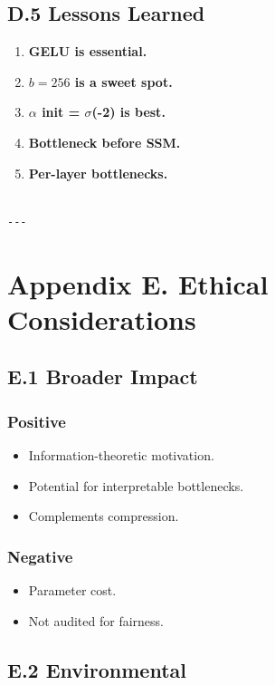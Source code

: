 \subsection{D.5 Lessons Learned}

\begin{enumerate}
\item \textbf{GELU is essential.}
\item \textbf{$b = 256$ is a sweet spot.}
\item \textbf{$\alpha$ init = $\sigma$(-2) is best.}
\item \textbf{Bottleneck before SSM.}
\item \textbf{Per-layer bottlenecks.}
\end{enumerate}
\begin{lstlisting}

---
\end{lstlisting}

\section{Appendix E. Ethical Considerations}

\subsection{E.1 Broader Impact}

\subsubsection{Positive}
\begin{itemize}
\item Information-theoretic motivation.
\item Potential for interpretable bottlenecks.
\item Complements compression.

\end{itemize}
\subsubsection{Negative}
\begin{itemize}
\item Parameter cost.
\item Not audited for fairness.

\end{itemize}
\subsection{E.2 Environmental}

